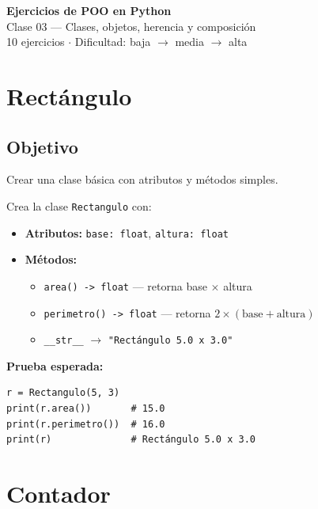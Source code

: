 \documentclass[11pt,letterpaper]{article}
\begin{document}
\begin{center}
  {\LARGE\bfseries Ejercicios de POO en Python}\\[6pt]
  {\large Clase 03 --- Clases, objetos, herencia y composición}\\[4pt]
  {\color{cm}\small 10 ejercicios $\cdot$ Dificultad: baja $\to$ media $\to$ alta}
\end{center}

\vspace{.6cm}


\hfill{}
\vspace{2pt}

\section{Rectángulo}
\subsection{Objetivo} Crear una clase básica con atributos y métodos simples.

Crea la clase \texttt{Rectangulo} con:
\begin{itemize}[nosep]
  \item \textbf{Atributos:} \texttt{base: float}, \texttt{altura: float}
  \item \textbf{Métodos:}
  \begin{itemize}[nosep]
    \item \texttt{area() -> float} --- retorna base $\times$ altura
    \item \texttt{perimetro() -> float} --- retorna $2 \times (\text{base} + \text{altura})$
    \item \texttt{\_\_str\_\_} $\to$ \texttt{"Rectángulo 5.0 x 3.0"}
  \end{itemize}
\end{itemize}

\textbf{Prueba esperada:}
\begin{lstlisting}
r = Rectangulo(5, 3)
print(r.area())       # 15.0
print(r.perimetro())  # 16.0
print(r)              # Rectángulo 5.0 x 3.0
\end{lstlisting}

\section{Contador}
\end{document}
